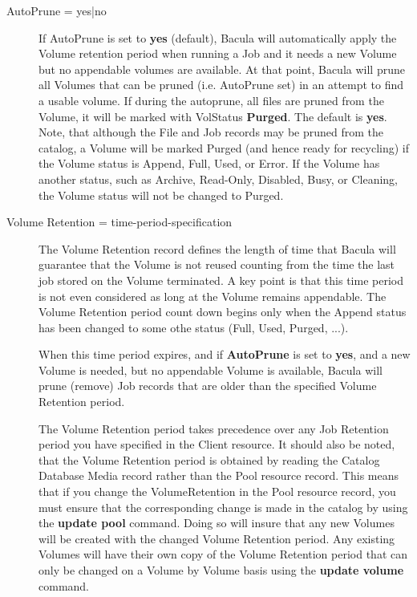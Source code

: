 \begin{description}

\item [AutoPrune = \lt{}yes|no\gt{}]
   If AutoPrune is set to  {\bf yes} (default), Bacula
   will  automatically apply the Volume retention period when running a Job  and
   it needs a new Volume but no appendable volumes are available.  At that point,
   Bacula will prune all Volumes that can be pruned  (i.e. AutoPrune set) in an
   attempt to find a usable volume. If  during the autoprune, all files are
   pruned from the Volume, it  will be marked with VolStatus {\bf Purged}.  The
   default is {\bf yes}. Note, that although the File and Job records may be 
   pruned from the catalog, a Volume will be marked Purged (and hence 
   ready for recycling) if the Volume status is Append, Full, Used, or Error.
   If the Volume has another status, such as Archive, Read-Only, Disabled,
   Busy, or Cleaning, the Volume status will not be changed to Purged.

\item [Volume Retention = \lt{}time-period-specification\gt{}]
   The Volume Retention record defines the length of time that Bacula will
   guarantee that the Volume is not reused counting from the time the last
   job stored on the Volume terminated.  A key point is that this time
   period is not even considered as long at the Volume remains appendable.
   The Volume Retention period count down begins only when the Append
   status has been changed to some othe status (Full, Used, Purged, ...).

   When this time period expires, and if {\bf AutoPrune} is set to {\bf
   yes}, and a new Volume is needed, but no appendable Volume is available,
   Bacula will prune (remove) Job records that are older than the specified
   Volume Retention period.

   The Volume Retention period takes precedence over any Job Retention
   period you have specified in the Client resource.  It should also be
   noted, that the Volume Retention period is obtained by reading the
   Catalog Database Media record rather than the Pool resource record.
   This means that if you change the VolumeRetention in the Pool resource
   record, you must ensure that the corresponding change is made in the
   catalog by using the {\bf update pool} command.  Doing so will insure
   that any new Volumes will be created with the changed Volume Retention
   period.  Any existing Volumes will have their own copy of the Volume
   Retention period that can only be changed on a Volume by Volume basis
   using the {\bf update volume} command.


\end{description}
